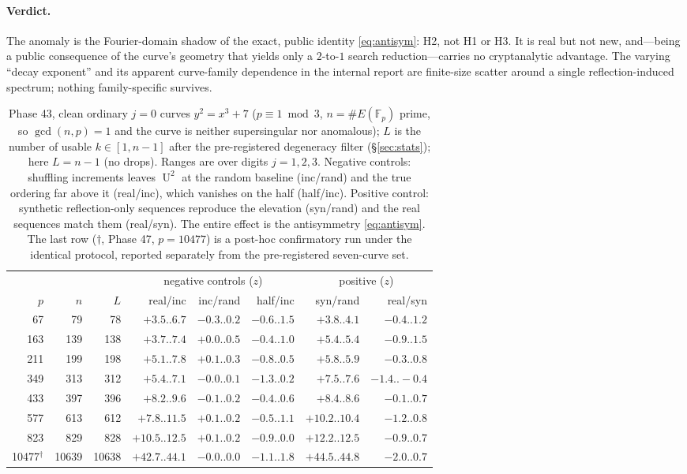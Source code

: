 \documentclass[11pt]{article}
\theoremstyle{definition}
\newcommand{\Fp}{\mathbb{F}_p}
\DeclareMathOperator{\Uk}{U}
\begin{document}
\paragraph{Verdict.} The anomaly is the Fourier-domain shadow of the
exact, public identity \eqref{eq:antisym}: H2, not H1 or H3. It is real
but not new, and---being a public consequence of the curve's geometry
that yields only a $2$-to-$1$ search reduction---carries no cryptanalytic
advantage. The varying ``decay exponent'' and its apparent curve-family
dependence in the internal report are finite-size scatter around a single
reflection-induced spectrum; nothing family-specific survives.

\begin{table}[t]
\centering
\small
\begin{tabular}{rrrrrrrr}
\toprule
& & & \multicolumn{3}{c}{negative controls ($z$)} & \multicolumn{2}{c}{positive ($z$)}\\
\cmidrule(lr){4-6}\cmidrule(lr){7-8}
$p$ & $n$ & $L$ & real/inc & inc/rand & half/inc & syn/rand & real/syn\\
\midrule
 67 &  79 &  78 & $+3.5..6.7$  & $-0.3..0.2$ & $-0.6..1.5$ & $+3.8..4.1$  & $-0.4..1.2$\\
163 & 139 & 138 & $+3.7..7.4$  & $+0.0..0.5$ & $-0.4..1.0$ & $+5.4..5.4$  & $-0.9..1.5$\\
211 & 199 & 198 & $+5.1..7.8$  & $+0.1..0.3$ & $-0.8..0.5$ & $+5.8..5.9$  & $-0.3..0.8$\\
349 & 313 & 312 & $+5.4..7.1$  & $-0.0..0.1$ & $-1.3..0.2$ & $+7.5..7.6$  & $-1.4..-0.4$\\
433 & 397 & 396 & $+8.2..9.6$  & $-0.1..0.2$ & $-0.4..0.6$ & $+8.4..8.6$  & $-0.1..0.7$\\
577 & 613 & 612 & $+7.8..11.5$ & $+0.1..0.2$ & $-0.5..1.1$ & $+10.2..10.4$& $-1.2..0.8$\\
823 & 829 & 828 & $+10.5..12.5$& $+0.1..0.2$ & $-0.9..0.0$ & $+12.2..12.5$& $-0.9..0.7$\\
\midrule
10477$^\dagger$ & 10639 & 10638 & $+42.7..44.1$ & $-0.0..0.0$ & $-1.1..1.8$ & $+44.5..44.8$ & $-2.0..0.7$\\
\bottomrule
\end{tabular}
\caption{Phase 43, clean ordinary $j{=}0$ curves $y^2=x^3+7$
($p\equiv 1\bmod 3$, $n=\#E(\Fp)$ prime, so $\gcd(n,p)=1$ and the curve
is neither supersingular nor anomalous); $L$ is the number of usable
$k\in[1,n-1]$ after the pre-registered degeneracy filter
(\S\ref{sec:stats}); here $L=n-1$ (no drops). Ranges are over digits
$j=1,2,3$. Negative controls: shuffling increments leaves $\Uk^2$ at the
random baseline (inc/rand) and the true ordering far above it (real/inc),
which vanishes on the half (half/inc). Positive control: synthetic
reflection-only sequences reproduce the elevation (syn/rand) and the real
sequences match them (real/syn). The entire effect is the antisymmetry
\eqref{eq:antisym}. The last row ($\dagger$, Phase 47, $p=10477$) is a
post-hoc confirmatory run under the identical protocol, reported
separately from the pre-registered seven-curve set.}
\label{tab:p43}
\end{table}
\end{document}
